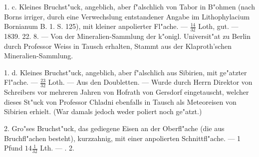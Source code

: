 \documentclass[a4paper, 11pt, oneside, polutonikogreek, german]{article}
\begin{document}
1. c. Kleines Bruchst"uck, angeblich, aber f"alschlich von Tabor in B"ohmen (nach Borns irriger, durch eine Verwechslung entstandener Angabe im Lithophylacium Bornianum B. 1. S. 125), mit kleiner anpolierter Fl"ache. --- $\mathfrak{\frac{14}{32}}$ Loth, gut. --- 1839. 22. 8. --- Von der Mineralien-Sammlung der k"onigl. Universit"at zu Berlin durch Professor Weiss in Tausch erhalten, Stammt aus der Klaproth'schen Mineralien-Sammlung.

1. d. Kleines Bruchst"uck, angeblich, aber f"alschlich aus Sibirien, mit ge"atzter Fl"ache. --- $\mathfrak{\frac{23}{32}}$ Loth. --- Aus den Doubletten. --- Wurde durch Herrn Direktor von Schreibers vor mehreren Jahren von Hofrath von Gersdorf eingetauscht, welcher dieses St"uck von Professor Chladni ebenfalls in Tausch als Meteoreisen von Sibirien erhielt. (War damals jedoch weder poliert noch ge"atzt.)

2. Gro"ses Bruchst"uck, das gediegene Eisen an der Oberfl"ache (die aus Bruchfl"achen besteht), kurzzahnig, mit einer anpolierten Schnittfl"ache. --- 1 Pfund $\mathfrak{14\frac{1}{32}}$ Lth. --- . 2.

\setlength{\leftskip}{10mm}
\setlength{\parindent}{0pt}
\end{document}
